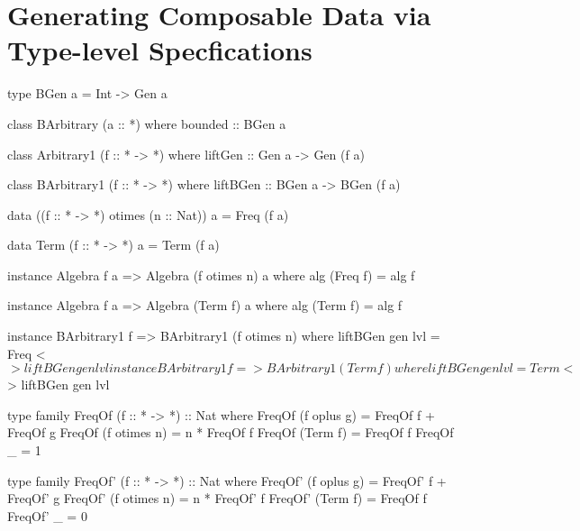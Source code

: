 \section{Generating Composable Data via Type-level Specfications}
\label{sec:generators}


\begin{code}
type BGen a = Int -> Gen a

class BArbitrary (a :: *) where
  bounded :: BGen a
\end{code}


\begin{code}
class Arbitrary1 (f :: * -> *) where
  liftGen :: Gen a -> Gen (f a)
\end{code}

\begin{code}
class BArbitrary1 (f :: * -> *) where
  liftBGen :: BGen a -> BGen (f a)
\end{code}

\begin{code}
data ((f :: * -> *) otimes (n :: Nat)) a = Freq (f a)
\end{code}

\begin{code}
data Term (f :: * -> *) a = Term (f a)
\end{code}

\begin{code}
instance Algebra f a => Algebra (f otimes n) a where
  alg (Freq f) = alg f
\end{code}

\begin{code}
instance Algebra f a => Algebra (Term f) a where
  alg (Term f) = alg f
\end{code}


\begin{code}
instance BArbitrary1 f => BArbitrary1 (f otimes n) where
  liftBGen gen lvl = Freq <$> liftBGen gen lvl

instance BArbitrary1 f => BArbitrary1 (Term f) where
  liftBGen gen lvl = Term <$> liftBGen gen lvl
\end{code}

\begin{code}
type family FreqOf (f :: * -> *) :: Nat where
  FreqOf (f oplus g)   = FreqOf f + FreqOf g
  FreqOf (f otimes n)  = n * FreqOf f
  FreqOf (Term f)      = FreqOf f
  FreqOf _             = 1
\end{code}

\begin{code}
type family FreqOf' (f :: * -> *) :: Nat where
  FreqOf' (f oplus g)   = FreqOf' f  +  FreqOf' g
  FreqOf' (f otimes n)  = n  *  FreqOf' f
  FreqOf' (Term f)      = FreqOf f
  FreqOf' _             = 0
\end{code}


